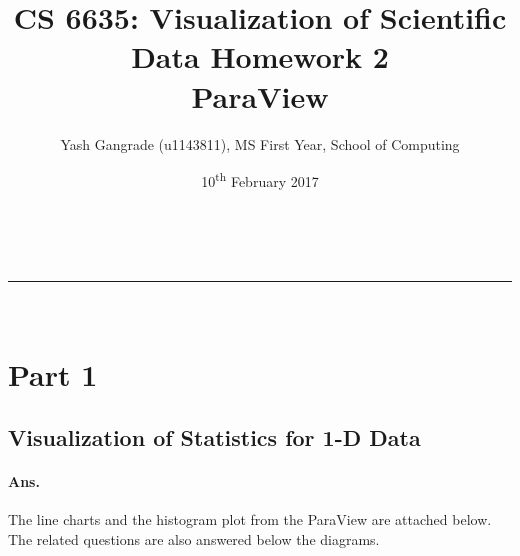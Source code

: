 \documentclass[a4paper,11pt]{article}
\makeatletter
\newcommand{\linia}{\rule{\linewidth}{0.5pt}}
\theoremstyle{mytheor}
\renewcommand{\maketitle}{
\begin{center}
\vspace{2ex}
{\huge \textsc{\@title}}
\vspace{1ex}
\\
\linia\\
\@author \hfill \@date
\vspace{4ex}
\end{center}
}
\makeatother
\begin{document}
\title{CS 6635: Visualization of Scientific Data Homework 2 \\ \large ParaView}

\author{Yash Gangrade (u1143811), MS First Year, School of Computing}

\date{10\textsuperscript{th} February 2017}
\maketitle
\tableofcontents
\listoffigures
\null \clearpage

\section{Part 1}
\subsection{Visualization of Statistics for 1-D Data}
\paragraph{Ans.}
The line charts and the histogram plot from the ParaView are attached below. The related questions are also answered below the diagrams.
\end{document}
